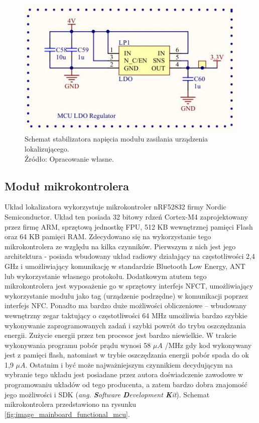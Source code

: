 \begin{figure}[H]
	\centering
	\includegraphics[width=12cm]{img/schematics/mainboard_power_ldo.jpg}
	\caption{Schemat stabilizatora napięcia modułu zasilania urządzenia lokalizującego. \\ Źródło: Opracowanie własne.}
	\label{fig:image_mainboard_power_ldo}
\end{figure}

\subsection{Moduł mikrokontrolera}

Układ lokalizatora wykorzystuje mikrokontroler nRF52832 firmy Nordic Semiconductor. Układ ten posiada 32 bitowy rdzeń Cortex-M4 zaprojektowany przez firmę ARM, sprzętową jednostkę FPU, 512 KB wewnętrznej pamięci Flash oraz 64 KB pamięci RAM. Zdecydowano się na wykorzystanie tego mikrokontrolera ze względu na kilka czynników. Pierwszym z nich jest jego architektura - posiada wbudowany układ radiowy działający na częstotliwości 2,4 GHz i umożliwiający komunikację w standardzie Bluetooth Low Energy, ANT lub wykorzystanie własnego protokołu. Dodatkowym atutem tego mikrokontrolera jest wyposażenie go w sprzętowy interfejs NFCT, umożliwiający wykorzystanie modułu jako tag (urządzenie podrzędne) w komunikacji poprzez interfejs NFC. Ponadto ma bardzo duże możliwości obliczeniowe – wbudowany wewnętrzny zegar taktujący o częstotliwości 64 MHz umożliwia bardzo szybkie wykonywanie zaprogramowanych zadań i szybki powrót do trybu oszczędzania energii. Zużycie energii przez ten procesor jest bardzo niewielkie. W trakcie wykonywania programu pobór prądu wynosi 58 $\mu A$ /MHz gdy kod wykonywany jest z pamięci flash, natomiast w trybie oszczędzania energii pobór spada do ok 1,9 $\mu A$. Ostatnim i być może najważniejszym czynnikiem decydującym na wybranie tego układu jest posiadane przez autora doświadczenie zawodowe w programowaniu układów od tego producenta, a zatem bardzo dobra znajomość jego możliwości i SDK (\textit{ang. \textbf{S}oftware \textbf{D}evelopment \textbf{K}it}). Schemat mikrokontrolera przedstawiono na rysunku \ref{fig:image_mainboard_functional_mcu}.

